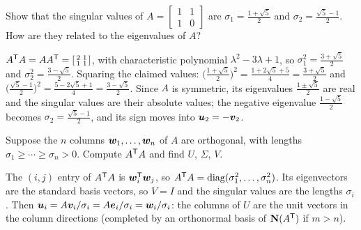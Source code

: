 \begin{exercise}\label{exr:u33-fib}
Show that the singular values of $A=\left[\begin{smallmatrix}1&1\\1&0\end{smallmatrix}\right]$ are
$\sigma_1=\frac{1+\sqrt5}{2}$ and $\sigma_2=\frac{\sqrt5-1}{2}$. How are they related to the
eigenvalues of $A$?
\end{exercise}
\begin{solution}
$A^{\mathsf{T}} A=AA^{\mathsf{T}}=\left[\begin{smallmatrix}2&1\\1&1\end{smallmatrix}\right]$, with characteristic polynomial
$\lambda^2-3\lambda+1$, so $\sigma_1^2=\frac{3+\sqrt5}{2}$ and $\sigma_2^2=\frac{3-\sqrt5}{2}$. Squaring the
claimed values: $\bigl(\frac{1+\sqrt5}{2}\bigr)^2=\frac{1+2\sqrt5+5}{4}=\frac{3+\sqrt5}{2}$ and
$\bigl(\frac{\sqrt5-1}{2}\bigr)^2=\frac{5-2\sqrt5+1}{4}=\frac{3-\sqrt5}{2}$. Since $A$ is symmetric, its
eigenvalues $\frac{1\pm\sqrt5}{2}$ are real and the singular values are their absolute values; the
negative eigenvalue $\frac{1-\sqrt5}{2}$ becomes $\sigma_2=\frac{\sqrt5-1}{2}$, and its sign moves into
$\boldsymbol{u}_2=-\boldsymbol{v}_2$.
\end{solution}

\begin{exercise}\label{exr:u33-orthcols}
Suppose the $n$ columns $\boldsymbol{w}_1,\dots,\boldsymbol{w}_n$ of $A$ are orthogonal, with lengths $\sigma_1\ge\cdots\ge\sigma_n>0$.
Compute $A^{\mathsf{T}} A$ and find $U$, $\Sigma$, $V$.
\end{exercise}
\begin{solution}
The $(i,j)$ entry of $A^{\mathsf{T}} A$ is $\boldsymbol{w}_i^{\mathsf{T}}\boldsymbol{w}_j$, so $A^{\mathsf{T}} A=\operatorname{diag}(\sigma_1^2,\dots,\sigma_n^2)$. Its
eigenvectors are the standard basis vectors, so $V=I$ and the singular values are the lengths
$\sigma_i$. Then $\boldsymbol{u}_i=A\boldsymbol{v}_i/\sigma_i=A\boldsymbol{e}_i/\sigma_i=\boldsymbol{w}_i/\sigma_i$: the columns of $U$ are the unit
vectors in the column directions (completed by an orthonormal basis of $\mathbf{N}(A^{\mathsf{T}})$ if $m>n$).
\end{solution}


